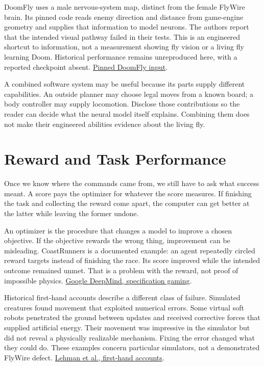 DoomFly uses a male nervous-system map, distinct from the female FlyWire brain. Its pinned code reads enemy direction and distance from game-engine geometry and supplies that information to model neurons. The authors report that the intended visual pathway failed in their tests. This is an engineered shortcut to information, not a measurement showing fly vision or a living fly learning Doom. Historical performance remains unreproduced here, with a reported checkpoint absent. \href{https://github.com/shreyash-sharma/doomFly/blob/5f6c2881be5f5f40b0592a75e6ee231b50333b40/src/doom/fearless/danger.py}{Pinned DoomFly input}.\par

A combined software system may be useful because its parts supply different capabilities. An outside planner may choose legal moves from a known board; a body controller may supply locomotion. Disclose those contributions so the reader can decide what the neural model itself explains. Combining them does not make their engineered abilities evidence about the living fly.\par

\section{Reward and Task Performance}

Once we know where the commands came from, we still have to ask what success
meant. A score pays the optimizer for whatever the score measures. If finishing
the task and collecting the reward come apart, the computer can get better at
the latter while leaving the former undone.\par

An optimizer is the procedure that changes a model to improve a chosen objective. If the objective rewards the wrong thing, improvement can be misleading. CoastRunners is a documented example: an agent repeatedly circled reward targets instead of finishing the race. Its score improved while the intended outcome remained unmet. That is a problem with the reward, not proof of impossible physics. \href{https://deepmind.google/blog/specification-gaming-the-flip-side-of-ai-ingenuity/}{Google DeepMind, specification gaming}.\par

Historical first-hand accounts describe a different class of failure. Simulated creatures found movement that exploited numerical errors. Some virtual soft robots penetrated the ground between updates and received corrective forces that supplied artificial energy. Their movement was impressive in the simulator but did not reveal a physically realizable mechanism. Fixing the error changed what they could do. These examples concern particular simulators, not a demonstrated FlyWire defect. \href{https://arxiv.org/html/1803.03453v4}{Lehman et al., first-hand accounts}.\par

